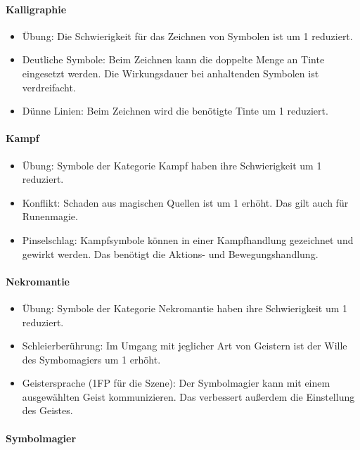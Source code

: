 \documentclass{article}
\begin{document}
\paragraph{Kalligraphie}

\begin{itemize}
\item Übung: Die Schwierigkeit für das Zeichnen von Symbolen ist um 1 reduziert.
\item Deutliche Symbole: Beim Zeichnen kann die doppelte Menge an Tinte eingesetzt werden. Die Wirkungsdauer bei anhaltenden Symbolen ist verdreifacht.
\item Dünne Linien: Beim Zeichnen wird die benötigte Tinte um 1 reduziert.
\end{itemize}

\paragraph{Kampf}

\begin{itemize}
\item Übung: Symbole der Kategorie Kampf haben ihre Schwierigkeit um 1 reduziert.
\item Konflikt: Schaden aus magischen Quellen ist um 1 erhöht. Das gilt auch für Runenmagie.
\item Pinselschlag: Kampfsymbole können in einer Kampfhandlung gezeichnet und gewirkt werden. Das benötigt die Aktions- und Bewegungshandlung.
\end{itemize}

\paragraph{Nekromantie}

\begin{itemize}
\item Übung: Symbole der Kategorie Nekromantie haben ihre Schwierigkeit um 1 reduziert.
\item Schleierberührung: Im Umgang mit jeglicher Art von Geistern ist der Wille des Symbomagiers um 1 erhöht.
\item Geistersprache (1FP für die Szene): Der Symbolmagier kann mit einem ausgewählten Geist kommunizieren. Das verbessert außerdem die Einstellung des Geistes.
\end{itemize}

\paragraph{Symbolmagier}
\end{document}
